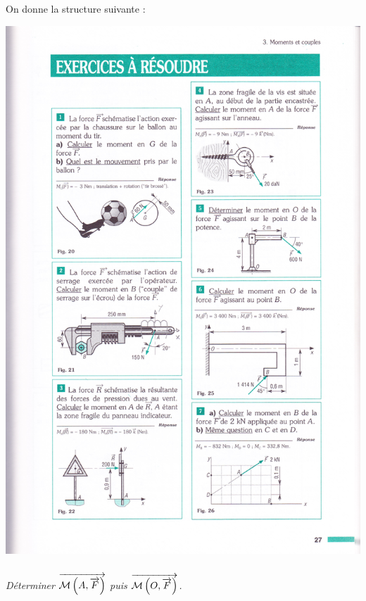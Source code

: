 \documentclass[10pt,fleqn]{article} %
\begin{document}
\begin{multicols}{2}
On donne la structure suivante : 
\begin{center}
\includegraphics[width=.6\linewidth]{images/fig_25}
\end{center}


\subparagraph{}
\textit{Déterminer $\overrightarrow{\mathcal{M}\left(A,\overrightarrow{F} \right)}$ puis $\overrightarrow{\mathcal{M}\left(O,\overrightarrow{F} \right)}$.}



\end{multicols}
\end{document}
